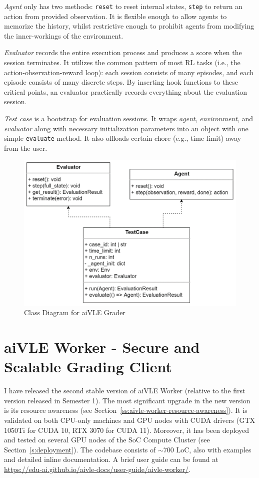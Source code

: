 \textit{Agent} only has two methods: \texttt{reset} to reset internal states, \texttt{step} to return an action from provided observation. It is flexible enough to allow agents to memorize the history, whilst restrictive enough to prohibit agents from modifying the inner-workings of the environment.

\textit{Evaluator} records the entire execution process and produces a score when the session terminates. It utilizes the common pattern of most RL tasks (i.e., the action-observation-reward loop): each session consists of many episodes, and each episode consists of many discrete steps. By inserting hook functions to these critical points, an evaluator practically records everything about the evaluation session. 

\textit{Test case} is a bootstrap for evaluation sessions. It wraps \textit{agent}, \textit{environment}, and \textit{evaluator} along with necessary initialization parameters into an object with one simple \texttt{evaluate} method. It also offloads certain chore (e.g., time limit) away from the user.

\begin{figure}[H]
    \centering
    \includegraphics{images/aivle-grader-class.png}
    \caption{Class Diagram for aiVLE Grader}
    \label{fig:aivle-grader-class}
\end{figure}

\section{aiVLE Worker - Secure and Scalable Grading Client}
\label{ch:aivle-worker}
I have released the second stable version of aiVLE Worker (relative to the first version released in Semester 1). The most significant upgrade in the new version is its resource awareness (see Section~\ref{ss:aivle-worker-resource-awareness}). It is validated on both CPU-only machines and GPU nodes with CUDA drivers (GTX 1050Ti for CUDA 10, RTX 3070 for CUDA 11). Moreover, it has been deployed and tested on several GPU nodes of the SoC Compute Cluster (see Section~\ref{s:deployment}). The codebase consists of $\sim$700 LoC, also with examples and detailed inline documentation. A brief user guide can be found at \href{https://edu-ai.github.io/aivle-docs/user-guide/aivle-worker/}{https://edu-ai.github.io/aivle-docs/user-guide/aivle-worker/}.

